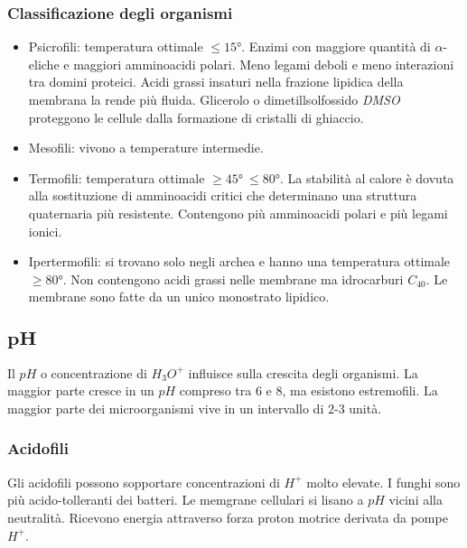 		\subsubsection{Classificazione degli organismi}
		\begin{multicols}{2}
			\begin{itemize}
				\item Psicrofili: temperatura ottimale $\le 15\si{\degree}$.
					Enzimi con maggiore quantit\`a di $\alpha$-eliche e maggiori amminoacidi polari.
					Meno legami deboli e meno interazioni tra domini proteici.
					Acidi grassi insaturi nella frazione lipidica della membrana la rende pi\`u fluida.
					Glicerolo o dimetillsolfossido \emph{DMSO} proteggono le cellule dalla formazione di cristalli di ghiaccio.
				\item Mesofili: vivono a temperature intermedie.
				\item Termofili: temperatura ottimale $\ge 45\si{\degree}\ \le 80\si{\degree}$.
					La stabilit\`a al calore \`e dovuta alla sostituzione di amminoacidi critici che determinano una struttura quaternaria pi\`u resistente.
					Contengono pi\`u amminoacidi polari e pi\`u legami ionici.
				\item Ipertermofili: si trovano solo negli archea e hanno una temperatura ottimale $\ge 80\si{\degree}$.
					Non contengono acidi grassi nelle membrane ma idrocarburi \emph{$C_40$}.
					Le membrane sono fatte da un unico monostrato lipidico. 
			\end{itemize}
		\end{multicols}

	\subsection{$\mathbf{pH}$}
	Il $pH$ o concentrazione di \emph{$H_3O^+$} influisce sulla crescita degli organismi.
	La maggior parte cresce in un $pH$ compreso tra $6$ e $8$, ma esistono estremofili.
	La maggior parte dei microorganismi vive in un intervallo di $2$-$3$ unit\`a.

		\subsubsection{Acidofili}
		Gli acidofili possono sopportare concentrazioni di \emph{$H^+$} molto elevate.
		I funghi sono pi\`u acido-tolleranti dei batteri.
		Le memgrane cellulari si lisano a $pH$ vicini alla neutralit\`a.
		Ricevono energia attraverso forza proton motrice derivata da pompe \emph{$H^+$}.

